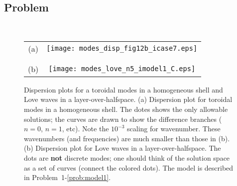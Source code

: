 \documentclass[11pt,titlepage,fleqn]{article}
\begin{document}

\subsection*{Problem} \howmuchtime\

\pagebreak






\clearpage\pagebreak
\begin{figure}
\centering
\begin{tabular}{cc}
(a) & \texttt{[image: modes\_disp\_fig12b\_icase7.eps]} \\
& \\ & \\
(b) & \texttt{[image: modes\_love\_n5\_imodel1\_C.eps]} 
\end{tabular}
\caption[]
{{
Dispersion plots for a toroidal modes in a homogeneous shell and Love waves in a layer-over-halfspace.
(a) Dispersion plot for toroidal modes in a homogeneous shell. The dotes shows the only allowable solutions; the curves are drawn to show the difference branches ($n=0$, $n=1$, etc). 
Note the $10^{-3}$ scaling for wavenumber. These wavenumbers (and frequencies) are much smaller than those in (b).
(b) Dispersion plot for Love waves in a layer-over-halfspace. The dots are {\bf not} discrete modes; one should think of the solution space as a set of curves (\ie connect the colored dots).
The model is described in Problem~1-\ref{prob:model1}.
\label{fig:dots}
}}
\end{figure}

\clearpage\pagebreak

\pagestyle{empty}
\end{document}
